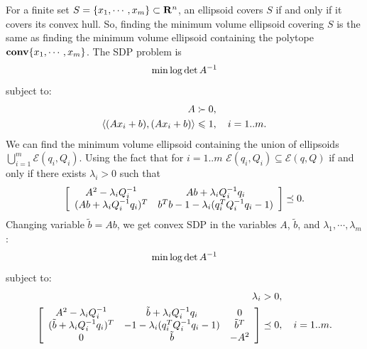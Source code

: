 \documentclass[letterpaper,10pt,english]{sphinxmanual}
\begin{document}
For a finite set \(S=\{x_1,\cdots,x_m\}\subset{\bf R}^n\), an
ellipsoid covers \(S\) if and only if it covers its convex hull. So,
finding the minimum volume ellipsoid covering \(S\) is the same as
finding the minimum volume ellipsoid containing the polytope
\({\bf conv}\{x_1,\cdots,x_m\}\). The SDP problem is
\begin{gather}
\begin{split}\min \log \det A^{-1}\end{split}\notag
\end{gather}
subject to:
\begin{gather}
\begin{split}\begin{aligned}
A & \succ  0, \\
\langle (Ax_i + b), (Ax_i + b)\rangle & \leqslant 1, ~~~ i=1..m.\end{aligned}\end{split}\notag
\end{gather}
We can find the minimum volume ellipsoid containing the union of
ellipsoids \(\bigcup_{i=1}^m{\mathcal E}(q_i,Q_i)\). Using the fact
that for \(i=1..m\)
\({\mathcal E}(q_i,Q_i)\subseteq{\mathcal E}(q,Q)\) if and only if
there exists \(\lambda_i>0\) such that
\begin{gather}
\begin{split}\left[\begin{array}{cc}
A^2 - \lambda_i Q_i^{-1} & Ab + \lambda_i Q_i^{-1}q_i\\
(Ab + \lambda_i Q_i^{-1}q_i)^T & b^Tb-1 - \lambda_i (q_i^TQ_i^{-1}q_i-1) \end{array}
\right] \preceq 0 .\end{split}\notag
\end{gather}
Changing variable \(\tilde{b}=Ab\), we get convex SDP in the
variables \(A\), \(\tilde{b}\), and
\(\lambda_1,\cdots,\lambda_m\):
\begin{gather}
\begin{split}\min \log \det A^{-1}\end{split}\notag
\end{gather}
subject to:
\begin{gather}
\begin{split}\begin{aligned}
\lambda_i & > 0,\\
\left[\begin{array}{ccc}
A^2-\lambda_iQ_i^{-1} & \tilde{b}+\lambda_iQ_i^{-1}q_i & 0 \\
(\tilde{b}+\lambda_iQ_i^{-1}q_i)^T & -1-\lambda_i(q_i^TQ_i^{-1}q_i-1) & \tilde{b}^T \\
0 & \tilde{b} & -A^2\end{array}\right] & \preceq 0, ~~~ i=1..m.\end{aligned}\end{split}\notag
\end{gather}
\end{document}
